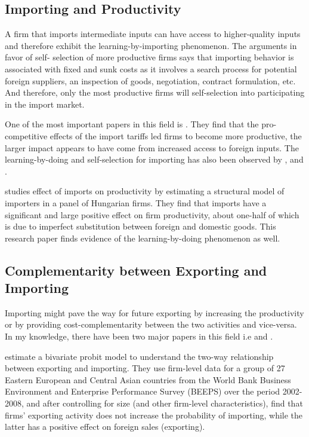 \documentclass[12pt]{article}
\begin{document}
\subsection*{Importing and Productivity}

A firm that imports intermediate inputs can have access to higher-quality inputs and
therefore exhibit the learning-by-importing phenomenon. The arguments in favor of self-
selection of more productive firms says that importing behavior is associated with fixed and
sunk costs as it involves a search process for potential foreign suppliers, an inspection of goods,
negotiation, contract formulation, etc. And therefore, only the most productive firms will
self-selection into participating in the import market.

One of the most important papers in this field
is \textcite{topalova2011trade}. They find that the pro-competitive
effects of the import tariffs led firms to become more
productive, the larger impact appears to have come from 
increased access to foreign inputs. The learning-by-doing and
self-selection for importing has also been observed by
\textcite{muuls2009imports}, and \textcite{kasahara2008does}. 

\textcite{halpern2011imported} studies effect of imports on productivity by estimating a structural
model of importers in a panel of Hungarian firms. They find that imports have
a significant and large positive effect on firm productivity, about one-half of which is due
to imperfect substitution between foreign and domestic goods. This
research paper finds evidence of the learning-by-doing phenomenon as
well.  

\subsection*{Complementarity between Exporting and Importing}

Importing might pave the way for future
exporting by increasing the productivity or by providing
cost-complementarity between the two activities and vice-versa. 
In my knowledge, there have been two major papers in this field
i.e \textcite{aristei2013firms} and \textcite{kasahara2013productivity}. 

\textcite{aristei2013firms} estimate a bivariate probit model to
understand the two-way relationship between exporting and importing. 
They use  firm-level data for a group of 27 Eastern European and 
Central Asian countries from the World Bank Business Environment 
and Enterprise Performance Survey (BEEPS) over the period 2002-2008, 
and after controlling for size (and other firm-level characteristics),
find that firms’ exporting activity does not increase the
probability of importing, while the latter has a positive effect
 on foreign sales (exporting). 
\end{document}
